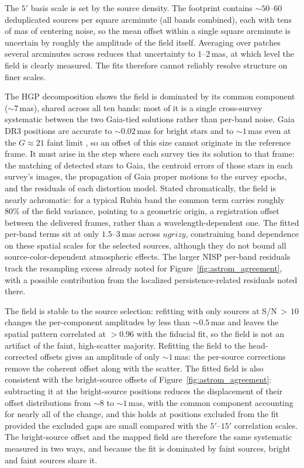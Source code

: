 \documentclass[twocolumn,linenumbers]{aastex701}
\begin{document}
The $5'$ basis scale is set by the source density. The footprint contains ${\sim}50$--$60$ deduplicated sources per square arcminute (all bands combined), each with tens of mas of centering noise, so the mean offset within a single square arcminute is uncertain by roughly the amplitude of the field itself. Averaging over patches several arcminutes across reduces that uncertainty to $1$--$2$\,mas, at which level the field is clearly measured. The fits therefore cannot reliably resolve structure on finer scales.

The HGP decomposition shows the field is dominated by its common component (${\sim}7$\,mas), shared across all ten bands: most of it is a single cross-survey systematic between the two Gaia-tied solutions rather than per-band noise. Gaia DR3 positions are accurate to ${\sim}0.02$\,mas for bright stars and to ${\sim}1$\,mas even at the $G\approx21$ faint limit \citep{gaia2023}, so an offset of this size cannot originate in the reference frame. It must arise in the step where each survey ties its solution to that frame: the matching of detected stars to Gaia, the centroid errors of those stars in each survey's images, the propagation of Gaia proper motions to the survey epochs, and the residuals of each distortion model. Stated chromatically, the field is nearly achromatic: for a typical Rubin band the common term carries roughly $80\%$ of the field variance, pointing to a geometric origin, a registration offset between the delivered frames, rather than a wavelength-dependent one. The fitted per-band terms sit at only $1.5$--$3$\,mas across $ugrizy$, constraining band dependence on these spatial scales for the selected sources, although they do not bound all source-color-dependent atmospheric effects. The larger NISP per-band residuals track the resampling excess already noted for Figure~\ref{fig:astrom_agreement}, with a possible contribution from the localized persistence-related residuals noted there.

The field is stable to the source selection: refitting with only sources at S/N\,${>}\,10$ changes the per-component amplitudes by less than ${\sim}0.5$\,mas and leaves the spatial pattern correlated at ${>}0.96$ with the fiducial fit, so the field is not an artifact of the faint, high-scatter majority. Refitting the field to the head-corrected offsets gives an amplitude of only ${\sim}1$\,mas: the per-source corrections remove the coherent offset along with the scatter. The fitted field is also consistent with the bright-source offsets of Figure~\ref{fig:astrom_agreement}: subtracting it at the bright-source positions reduces the displacement of their offset distributions from ${\sim}8$ to ${\sim}1$\,mas, with the common component accounting for nearly all of the change, and this holds at positions excluded from the fit provided the excluded gaps are small compared with the $5'$--$15'$ correlation scales. The bright-source offset and the mapped field are therefore the same systematic measured in two ways, and because the fit is dominated by faint sources, bright and faint sources share it.
\end{document}
